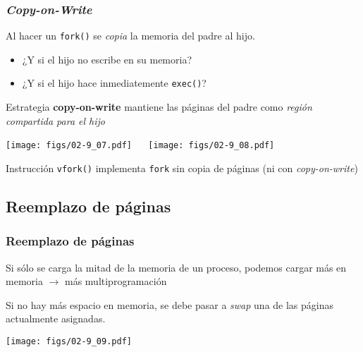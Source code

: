 \documentclass[letter]{beamer}
\begin{document}
\begin{frame}
  \frametitle{{\em Copy-on-Write}}

  Al hacer un {\tt fork()} se {\em copia} la memoria del padre al hijo.
  
  \begin{itemize}
    \item ¿Y si el hijo no escribe en su memoria?
    \item ¿Y si el hijo hace inmediatemente {\tt exec()}?
  \end{itemize}
  
  Estrategia {\bf copy-on-write} mantiene las páginas del padre como
  {\em región compartida para el hijo}
  
  \begin{center}
    \texttt{[image: figs/02-9\_07.pdf]}
    \,\,\,\,\,\,
    \texttt{[image: figs/02-9\_08.pdf]}
  \end{center}

  Instrucción {\tt vfork()} implementa {\tt fork} sin copia de páginas (ni con {\em copy-on-write})
  
\end{frame}

\subsection{Reemplazo de páginas}

\begin{frame}
  \frametitle{Reemplazo de páginas}

  Si sólo se carga la mitad de la memoria de un proceso, podemos cargar
  más en memoria $\to$ más multiprogramación

  Si no hay más espacio en memoria, se debe pasar a {\em swap} una de las páginas
  actualmente asignadas.

  \begin{center}
    \texttt{[image: figs/02-9\_09.pdf]}
  \end{center}
  
  

\end{frame}
\end{document}
